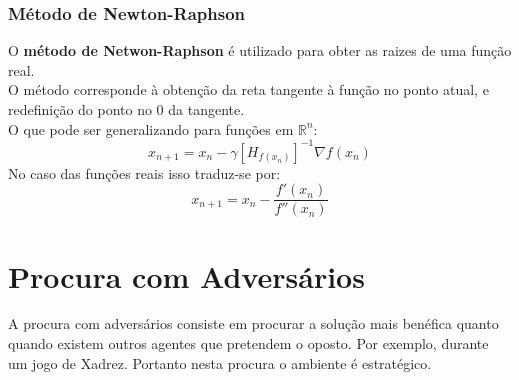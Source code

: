 \documentclass[]{report}
\begin{document}
\subsection{Método de Newton-Raphson}
O \textbf{método de Netwon-Raphson} é utilizado para obter as raizes de uma função real.\\
O método corresponde à obtenção da reta tangente à função no ponto atual, e redefinição do ponto no 0 da tangente.\\
O que pode ser generalizando para funções em $\mathbb{R}^n$:
$$x_{n+1} = x_n - \gamma [H_{f(x_n)}]^{-1}\nabla f(x_n)$$
No caso das funções reais isso traduz-se por:
$$x_{n+1} = x_n - \frac{f'(x_n)}{f''(x_n)}$$
\chapter{Procura com Adversários}
A procura com adversários consiste em procurar a solução mais benéfica quanto quando existem outros agentes que pretendem o oposto. Por exemplo, durante um jogo de Xadrez.
Portanto nesta procura o ambiente é estratégico.
\end{document}
